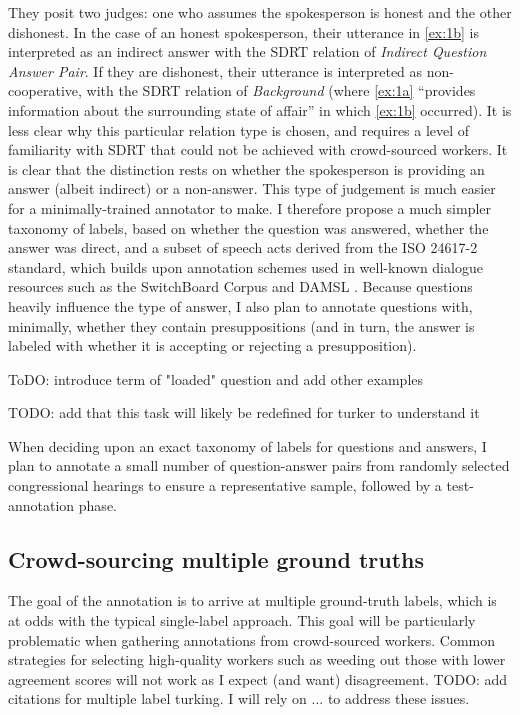 They posit two judges: one who assumes the spokesperson is honest and the other dishonest. In the case of an honest spokesperson, their utterance in \ref{ex:1b} is interpreted as an indirect answer with the SDRT relation of \emph{Indirect Question Answer Pair}. If they are dishonest, their utterance is interpreted as non-cooperative, with the SDRT relation of \emph{Background} (where \ref{ex:1a} ``provides information about the surrounding state of affair'' in which \ref{ex:1b} occurred). It is less clear why this particular relation type is chosen, and requires a level of familiarity with SDRT that could not be achieved with crowd-sourced workers. It is clear that the distinction rests on whether the spokesperson is providing an answer (albeit indirect) or a non-answer. This type of judgement is much easier for a minimally-trained annotator to make. I therefore propose a much simpler taxonomy of labels, based on whether the question was answered, whether the answer was direct, and a subset of speech acts derived from the ISO 24617-2 standard, which builds upon annotation schemes used in well-known dialogue resources such as the SwitchBoard Corpus and DAMSL \citep{Bunt:2018}. Because questions heavily influence the type of answer, I also plan to annotate questions with, minimally, whether they contain presuppositions (and in turn, the answer is labeled with whether it is accepting or rejecting a presupposition).

ToDO: introduce term of "loaded" question and add other examples

TODO: add that this task will likely be redefined for turker to understand it 

When deciding upon an exact taxonomy of labels for questions and answers, I plan to annotate a small number of question-answer pairs from randomly selected congressional hearings to ensure a representative sample, followed by a test-annotation phase. 

\subsection{Crowd-sourcing multiple ground truths}
The goal of the annotation is to arrive at multiple ground-truth labels, which is at odds with the typical single-label approach. This goal will be particularly problematic when gathering annotations from crowd-sourced workers. Common strategies for selecting high-quality workers such as weeding out those with lower agreement scores will not work as I expect (and want) disagreement. 
TODO: add citations for multiple label turking. I will rely on ... to address these issues.

